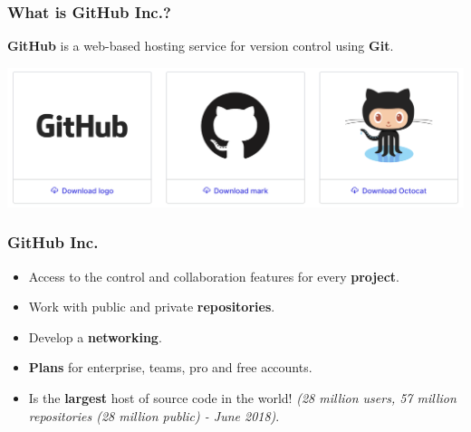 \documentclass[svgnames]{beamer}
\begin{document}
\begin{frame}
    \frametitle{What is GitHub Inc.?}

    \begin{center}
        \textbf{GitHub} is a web-based hosting service for version control using \textbf{Git}.
    \end{center}

    \begin{center}
        \includegraphics[scale=0.2]{img/github_logos.png}
    \end{center}
\end{frame}


\begin{frame}
    \frametitle{GitHub Inc.}
    \begin{itemize}
        \item Access to the control and collaboration features for every \textbf{project}. \hfill \break
        \item Work with public and private \textbf{repositories}. \hfill \break
        \item Develop a \textbf{networking}. \hfill \break
        \item \textbf{Plans} for enterprise, teams, pro and free accounts. \hfill \break
        \item Is the \textbf{largest} host of source code in the world! \emph{(28 million users, 57 million repositories (28 million public) - June 2018)}.
    \end{itemize}
\end{frame}
\end{document}
